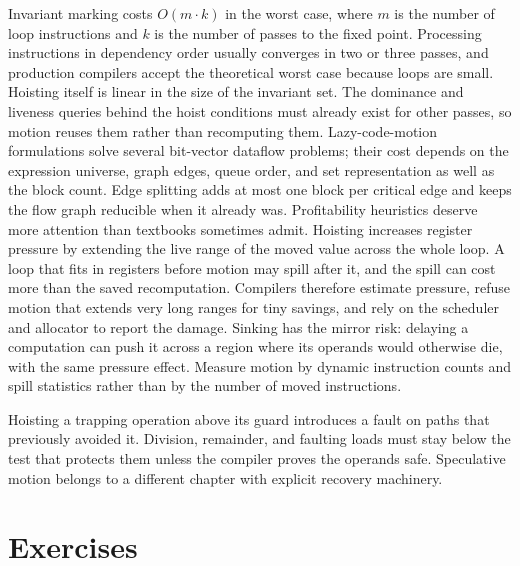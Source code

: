Invariant marking costs $O(m \cdot k)$ in the worst case, where $m$ is the number of loop instructions and $k$ is the number of passes to the fixed point.
Processing instructions in dependency order usually converges in two or three passes, and production compilers accept the theoretical worst case because loops are small.
Hoisting itself is linear in the size of the invariant set.
The dominance and liveness queries behind the hoist conditions must already exist for other passes, so motion reuses them rather than recomputing them.
Lazy-code-motion formulations solve several bit-vector dataflow problems; their cost depends on the expression universe, graph edges, queue order, and set representation as well as the block count.
Edge splitting adds at most one block per critical edge and keeps the flow graph reducible when it already was.
Profitability heuristics deserve more attention than textbooks sometimes admit.
Hoisting increases register pressure by extending the live range of the moved value across the whole loop.
A loop that fits in registers before motion may spill after it, and the spill can cost more than the saved recomputation.
Compilers therefore estimate pressure, refuse motion that extends very long ranges for tiny savings, and rely on the scheduler and allocator to report the damage.
Sinking has the mirror risk: delaying a computation can push it across a region where its operands would otherwise die, with the same pressure effect.
Measure motion by dynamic instruction counts and spill statistics rather than by the number of moved instructions.

\begin{ccwarning}
Hoisting a trapping operation above its guard introduces a fault on paths that previously avoided it.
Division, remainder, and faulting loads must stay below the test that protects them unless the compiler proves the operands safe.
Speculative motion belongs to a different chapter with explicit recovery machinery.
\end{ccwarning}

\section{Exercises}
\label{sec:ch17-exercises}


